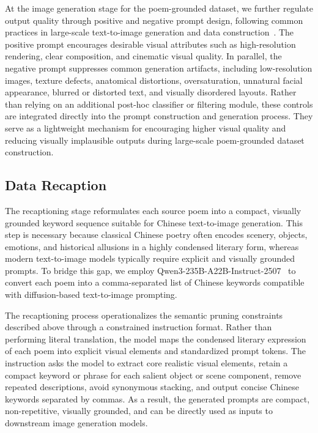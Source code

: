At the image generation stage for the poem-grounded dataset, we further regulate output quality through positive and negative prompt design, following common practices in large-scale text-to-image generation and data construction~\cite{schuhmann2022laion,wang2022diffusiondb,openclip2022,zhang2024longclip}. The positive prompt encourages desirable visual attributes such as high-resolution rendering, clear composition, and cinematic visual quality. In parallel, the negative prompt suppresses common generation artifacts, including low-resolution images, texture defects, anatomical distortions, oversaturation, unnatural facial appearance, blurred or distorted text, and visually disordered layouts. Rather than relying on an additional post-hoc classifier or filtering module, these controls are integrated directly into the prompt construction and generation process. They serve as a lightweight mechanism for encouraging higher visual quality and reducing visually implausible outputs during large-scale poem-grounded dataset construction.

\subsection{Data Recaption}

The recaptioning stage reformulates each source poem into a compact, visually grounded keyword sequence suitable for Chinese text-to-image generation. This step is necessary because classical Chinese poetry often encodes scenery, objects, emotions, and historical allusions in a highly condensed literary form, whereas modern text-to-image models typically require explicit and visually grounded prompts. To bridge this gap, we employ Qwen3-235B-A22B-Instruct-2507~\cite{qwen3technicalreport} to convert each poem into a comma-separated list of Chinese keywords compatible with diffusion-based text-to-image prompting.

The recaptioning process operationalizes the semantic pruning constraints described above through a constrained instruction format. Rather than performing literal translation, the model maps the condensed literary expression of each poem into explicit visual elements and standardized prompt tokens. The instruction asks the model to extract core realistic visual elements, retain a compact keyword or phrase for each salient object or scene component, remove repeated descriptions, avoid synonymous stacking, and output concise Chinese keywords separated by commas. As a result, the generated prompts are compact, non-repetitive, visually grounded, and can be directly used as inputs to downstream image generation models.

